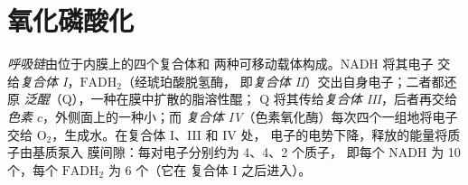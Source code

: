\section{氧化磷酸化}

\begin{definition}[呼吸链]\label{def:b1:respiration-fermentation:chain}
\emph{呼吸链}由位于内膜上的四个复合体和
两种可移动载体构成。NADH 将其电子
交给\emph{复合体 I}，$\mathrm{FADH_2}$（经琥珀酸脱氢酶，
即\emph{复合体 II}）交出自身电子；二者都还原
\emph{泛醌}（Q），一种在膜中扩散的脂溶性醌；
Q 将其传给\emph{复合体 III}，后者再交给
\emph{色素 $c$}，外侧面上的一种小；而
\emph{复合体 IV}（色素氧化酶）每次四个一组地将电子
交给 $\mathrm{O_2}$，生成水。在复合体 I、III 和 IV 处，
电子的电势下降，释放的能量将质子由基质泵入
膜间隙：每对电子分别约为 4、4、2 个质子，
即每个 NADH 为 10 个，每个 $\mathrm{FADH_2}$ 为 6 个（它在
复合体 I 之后进入）。
\end{definition}

